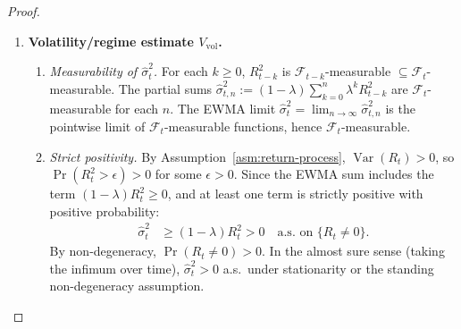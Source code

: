 \documentclass[12pt,openany]{book}
\newcommand{\calF}{\mathcal{F}}
\numberwithin{equation}{chapter}
\theoremstyle{plain}
\theoremstyle{definition}
\theoremstyle{remark}
\numberwithin{equation}{chapter}
\theoremstyle{plain}
\DeclareMathOperator{\Var}{Var}
\begin{document}
\begin{proof}
\begin{enumerate}
\begin{enumerate}
      \item \emph{Measurability and domain of $H$.}
        Since $|\cdot|$ and multiplication by
        $S_t > 0$ ($\calF_t$-measurable) are
        Borel-measurable operations:
        \begin{align}
          H
            &= |\Delta_t^{\mathrm{port}}| \cdot S_t
             \in [0, \infty).
        \end{align}
        Finiteness follows from the finite capital constraint
        ($|n_t^{(i)}|$ bounded) and $|\delta_t^{(i)}| \leq 1$.

      \item \emph{Boundary case $H = 0$.}
        $H = 0 \iff \Delta_t^{\mathrm{port}} = 0$, i.e.\ the
        portfolio is delta-neutral.  This is admissible and in
        the domain $[0,\infty)$.
    \end{enumerate}

  \item \textbf{Volatility/regime estimate $V_{\mathrm{vol}}$.}

    \begin{enumerate}
      \item \emph{Measurability of $\hat{\sigma}_t^2$.}
        For each $k \geq 0$, $R_{t-k}^2$ is
        $\calF_{t-k}$-measurable $\subseteq \calF_t$-measurable.
        The partial sums
        $\hat{\sigma}_{t,n}^2
          := (1-\lambda)\sum_{k=0}^{n} \lambda^k R_{t-k}^2$
        are $\calF_t$-measurable for each $n$.
        The EWMA limit
        $\hat{\sigma}_t^2
          = \lim_{n\to\infty} \hat{\sigma}_{t,n}^2$
        is the pointwise limit of $\calF_t$-measurable
        functions, hence $\calF_t$-measurable.

      \item \emph{Strict positivity.}
        By Assumption~\ref{asm:return-process},
        $\Var(R_t) > 0$, so
        $\Pr(R_t^2 > \epsilon) > 0$ for some $\epsilon > 0$.
        Since the EWMA sum includes the term
        $(1-\lambda)R_t^2 \geq 0$, and at least one term is
        strictly positive with positive probability:
        \begin{align}
          \hat{\sigma}_t^2
            &\geq (1-\lambda) R_t^2
             > 0
             \quad \text{a.s.\ on } \{R_t \neq 0\}.
        \end{align}
        By non-degeneracy, $\Pr(R_t \neq 0) > 0$.
        In the almost sure sense (taking the infimum over time),
        $\hat{\sigma}_t^2 > 0$ a.s.\ under stationarity or
        the standing non-degeneracy assumption.


\end{enumerate}
\end{enumerate}
\end{proof}
\end{document}
